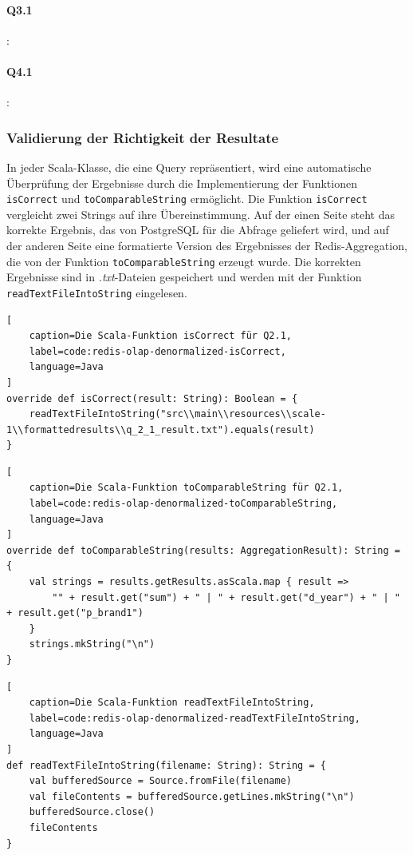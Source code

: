 \paragraph{Q3.1}:

\paragraph{Q4.1}:

\subsubsection{Validierung der Richtigkeit der Resultate}
In jeder Scala-Klasse, die eine Query repräsentiert, wird eine automatische Überprüfung der Ergebnisse durch die Implementierung der Funktionen \lstinline|isCorrect| und \lstinline|toComparableString| ermöglicht.
Die Funktion \lstinline|isCorrect| vergleicht zwei Strings auf ihre Übereinstimmung. Auf der einen Seite steht das korrekte Ergebnis, das von PostgreSQL für die Abfrage geliefert wird, und auf der anderen Seite eine formatierte Version des Ergebnisses der Redis-Aggregation, die von der Funktion \lstinline|toComparableString| erzeugt wurde.
Die korrekten Ergebnisse sind in \emph{.txt}-Dateien gespeichert und werden mit der Funktion \lstinline|readTextFileIntoString| eingelesen.

\begin{lstlisting}[
    caption=Die Scala-Funktion isCorrect für Q2.1,
    label=code:redis-olap-denormalized-isCorrect,
    language=Java
]
override def isCorrect(result: String): Boolean = {
	readTextFileIntoString("src\\main\\resources\\scale-1\\formattedresults\\q_2_1_result.txt").equals(result)
}
\end{lstlisting}

\begin{lstlisting}[
    caption=Die Scala-Funktion toComparableString für Q2.1,
    label=code:redis-olap-denormalized-toComparableString,
    language=Java
]
override def toComparableString(results: AggregationResult): String = {
	val strings = results.getResults.asScala.map { result =>
		"" + result.get("sum") + " | " + result.get("d_year") + " | " + result.get("p_brand1")
	}
	strings.mkString("\n")
}
\end{lstlisting}

\begin{lstlisting}[
    caption=Die Scala-Funktion readTextFileIntoString,
    label=code:redis-olap-denormalized-readTextFileIntoString,
    language=Java
]
def readTextFileIntoString(filename: String): String = {
	val bufferedSource = Source.fromFile(filename)
	val fileContents = bufferedSource.getLines.mkString("\n")
	bufferedSource.close()
	fileContents
}
\end{lstlisting}

